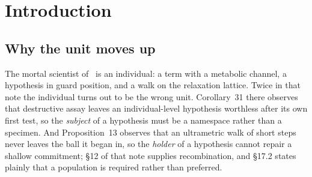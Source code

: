 \documentclass[11pt,a4paper]{article}
\theoremstyle{plain}
\theoremstyle{definition}
\theoremstyle{remark}
\begin{document}
\begin{abstract}
We then measure. A second environment---Nim---is laddered exactly by the same method and
schedule as~\cite{game}, and it inverts that note's headline: in Nim$(1,2,3)$ marginal return
\emph{rises} up the ladder and the complete theory is the best purchase on it, where in
noughts-and-crosses returns collapse and the complete theory is dominated. Whether truth is
affordable is a property of the environment, not of the learner, and composition puts several
such answers under one conserved budget. Composing the two over a single rate-limited
reservoir gives a closed form: each learner retains exactly the fraction $c_{\text{other}} /
(c_{\text{self}}+c_{\text{other}})$ of the inquiry it could afford alone. The dilution is
regressive---it costs the unfinished science $66.9\%$ of its affordable depth and the finished
one nothing---and it is delivered without either learner perceiving, modelling, or touching the
other. Finally, exhaustion of a shared reservoir forces the grading vector to change, and only
the learner that was confined retains the apparatus to change it. We close on the observation
that composition is the exit from the heat death of~\cite{game}: a population that has solved its
science stops eating, and the cheapest way to make it eat again is to compose it with a learner
whose namespace it has not solved.
\end{abstract}

\tableofcontents

\section{Introduction}

\subsection{Why the unit moves up}

The mortal scientist of~\cite{scientist} is an individual: a term with a metabolic channel, a
hypothesis in guard position, and a walk on the relaxation lattice. Twice in that note the
individual turns out to be the wrong unit. Corollary~31 there observes that destructive assay
leaves an individual-level hypothesis worthless after its own first test, so the \emph{subject} of
a hypothesis must be a namespace rather than a specimen. And Proposition~13 observes that an
ultrametric walk of short steps never leaves the ball it began in, so the \emph{holder} of a
hypothesis cannot repair a shallow commitment; \S12 of that note supplies recombination, and
\S17.2 states plainly that a population is required rather than preferred.
\end{document}
